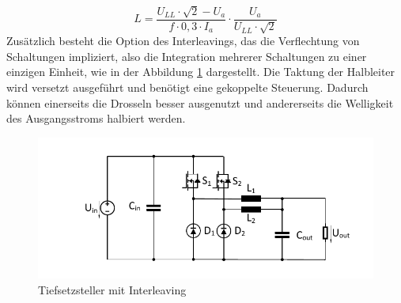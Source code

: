 		\begin{equation}
			\label{eq:BuckLB6}
			L=\dfrac{U_{LL} \cdot \sqrt{2}-U_{a}}{f\cdot 0,3 \cdot I_{a}}\cdot \dfrac{U_{a}}{U_{LL} \cdot \sqrt{2}}
		\end{equation}
		Zusätzlich besteht die Option des Interleavings, das die Verflechtung von Schaltungen impliziert, also die Integration mehrerer Schaltungen zu einer einzigen Einheit, wie in der Abbildung \ref{fig:buckinterleaved} dargestellt. Die Taktung der Halbleiter wird versetzt ausgeführt und benötigt eine gekoppelte Steuerung. Dadurch können einerseits die Drosseln besser ausgenutzt und andererseits die Welligkeit des Ausgangsstroms halbiert werden. 
		\begin{figure}
			\centering
			\includegraphics[width=0.7\linewidth]{content/Grafiken/Buck_interleaved}
			\caption{Tiefsetzsteller mit Interleaving}
			\label{fig:buckinterleaved}
		\end{figure}
		
		

